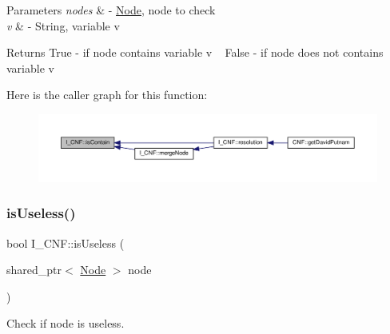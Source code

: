 \begin{DoxyParams}{Parameters}
{\em nodes} & -\/ \hyperlink{class_node}{Node}, node to check \\
\hline
{\em v} & -\/ String, variable v \\
\hline
\end{DoxyParams}
\begin{DoxyReturn}{Returns}
True -\/ if node contains variable v ~\newline
 False -\/ if node does not contains variable v 
\end{DoxyReturn}
Here is the caller graph for this function\+:\nopagebreak
\begin{figure}[H]
\begin{center}
\leavevmode
\includegraphics[width=350pt]{d5/d80/struct_i___c_n_f_a41a7be439cae3ed577a30b3f2742218e_icgraph}
\end{center}
\end{figure}
\mbox{\label{struct_i___c_n_f_ae9f978965edae4ab57c692544cb72d01}} 
\subsubsection{\texorpdfstring{is\+Useless()}{isUseless()}}
{\footnotesize\ttfamily bool I\+\_\+\+C\+N\+F\+::is\+Useless (\begin{DoxyParamCaption}\item[{shared\+\_\+ptr$<$ \hyperlink{class_node}{Node} $>$}]{node }\end{DoxyParamCaption})\hspace{0.3cm}{\ttfamily [static]}}



Check if node is useless. 


